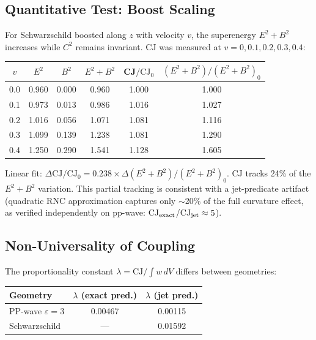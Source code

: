 \documentclass[11pt,a4paper]{article}
\begin{document}
\subsection{Quantitative Test: Boost Scaling}

For Schwarzschild boosted along $z$ with velocity $v$, the superenergy $E^2+B^2$ increases while $C^2$ remains invariant. CJ was measured at $v = 0, 0.1, 0.2, 0.3, 0.4$:

\begin{center}
\begin{tabular}{cccccc}
\toprule
$v$ & $E^2$ & $B^2$ & $E^2+B^2$ & CJ$/\text{CJ}_0$ & $(E^2\!+\!B^2)/(E^2\!+\!B^2)_0$ \\
\midrule
0.0 & 0.960 & 0.000 & 0.960 & 1.000 & 1.000 \\
0.1 & 0.973 & 0.013 & 0.986 & 1.016 & 1.027 \\
0.2 & 1.016 & 0.056 & 1.071 & 1.081 & 1.116 \\
0.3 & 1.099 & 0.139 & 1.238 & 1.081 & 1.290 \\
0.4 & 1.250 & 0.290 & 1.541 & 1.128 & 1.605 \\
\bottomrule
\end{tabular}
\end{center}

Linear fit: $\Delta\text{CJ}/\text{CJ}_0 = 0.238 \times \Delta(E^2\!+\!B^2)/(E^2\!+\!B^2)_0$. CJ tracks 24\% of the $E^2+B^2$ variation. This partial tracking is consistent with a jet-predicate artifact (quadratic RNC approximation captures only $\sim$20\% of the full curvature effect, as verified independently on pp-wave: CJ$_{\rm exact}$/CJ$_{\rm jet} \approx 5$).

\subsection{Non-Universality of Coupling}

The proportionality constant $\lambda = \text{CJ}/\!\int\! w\,dV$ differs between geometries:

\begin{center}
\begin{tabular}{lcc}
\toprule
Geometry & $\lambda$ (exact pred.) & $\lambda$ (jet pred.) \\
\midrule
PP-wave $\varepsilon\!=\!3$ & 0.00467 & 0.00115 \\
Schwarzschild & --- & 0.01592 \\
\bottomrule
\end{tabular}
\end{center}
\end{document}
